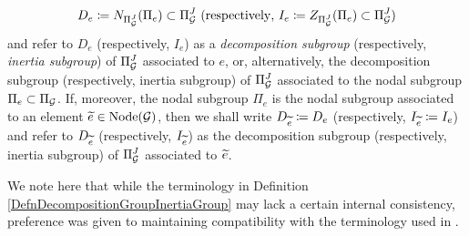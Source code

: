\begin{defn}
\begin{enumerate}
    \[
      D_e \coloneqq N_{\Pi_{\mathcal{G}}^J}(\Pi_e) \subset \Pi_{\mathcal{G}}^J \ \mathrm{(respectively, \ } I_e \coloneqq Z_{\Pi_{\mathcal{G}}^J}(\Pi_e) \subset \Pi_{\mathcal{G}}^J \mathrm{)}
    \]
    and refer to $D_e$ (respectively, $I_e$) as a \emph{decomposition subgroup} (respectively, \emph{inertia subgroup}) of $\Pi_{\mathcal{G}}^J$ associated to $e$, or, alternatively, the decomposition subgroup (respectively, inertia subgroup) of $\Pi_{\mathcal{G}}^J$ associated to the nodal subgroup $\Pi_e \subset \Pi_{\mathcal{G}}$. If, moreover, the nodal subgroup $\Pi_e$ is the nodal subgroup associated to an element $\widetilde{e} \in \mathrm{Node}(\mathcal{G})$, then we shall write $D_{\widetilde{e}} \coloneqq D_e$ (respectively, $I_{\widetilde{e}} \coloneqq I_e$) and refer to $D_{\widetilde{e}}$ (respectively, $I_{\widetilde{e}}$) as the decomposition subgroup (respectively, inertia subgroup) of $\Pi_{\mathcal{G}}^J$ associated to $\widetilde{e}$.
  \end{enumerate}
\end{defn}

\begin{rem}
  We note here that while the terminology in Definition \ref{DefnDecompositionGroupInertiaGroup} may lack a certain internal consistency, preference was given to maintaining compatibility with the terminology used in \cite[Definition 2.2]{NodNon}.
\end{rem}


